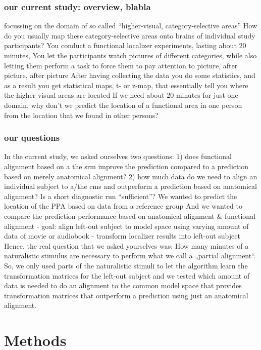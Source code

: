 \subsubsection{our current study: overview, blabla}
%
focussing on the domain of so called ``higher-visual, category-selective
areas''
%
How do you usually map these category-selective areas onto brains of individual
study participants?
%
You conduct a functional localizer experiments, lasting about 20 minutes,
%
You let the participants watch pictures of different categories, while also
letting them perform a task to force them to pay attention to picture, after
picture, after picture
%
After having collecting the data you do some statistics, and as a result you
get statistical maps, t- or z-map, that essentially tell you where the
higher-visual areas are located
%
If we need about 20 minutes for just one domain, why don’t we predict the
location of a functional area in one person from the location that we found in
other persons?


\subsubsection{our questions}
In the current study, we asked ourselves two questions:
%
1) does functional alignment based on a the \ac{srm} improve the prediction
compared to a prediction based on merely anatomical alignment?
%
2) how much data do we need to align an individual subject to a/the \ac{cms} and
outperform a prediction based on anatomical alignment? Is a short diagnostic run
``sufficient''?
%
We wanted to predict the location of the PPA based on data from a reference
group
%
And we wanted to compare the prediction performance based on anatomical
alignment \& functional alignment
%
- goal: align left-out subject to model space using varying amount of data of
movie or audiobook - transform localizer results into left-out subject
%
Hence, the real question that we asked yourselves was: How many minutes of a
naturalistic stimulus are necessary to perform what we call a „partial
alignment“.
%
So, we only used parts of the naturalistic stimuli to let the algorithm learn
the transformation matrices for the left-out subject
%
and we tested which amount of data is needed to do an alignment to the common
model space that provides transformation matrices that outperform a prediction
using just an anatomical alignment.


\section{Methods}

